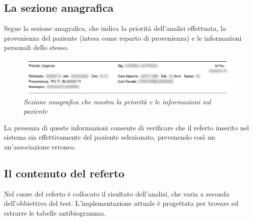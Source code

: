 \subsection{La sezione anagrafica}
Segue la sezione anagrafica, che indica la priorità dell'analisi effettuata, la provenienza del paziente (intesa come reparto di provenienza) e le informazioni personali dello stesso.
\begin{figure}[h!]
	\centering
	\includegraphics[width=.99\columnwidth]{images/sezione_anagrafica.png}
	\caption{\textit{Sezione anagrafica che mostra la priorità e le informazioni sul paziente}}
	\label{fig:header}
\end{figure}
\bigskip
\newline
La presenza di queste informazioni consente di verificare che il referto inserito nel sistema sia effettivamente del paziente selezionato, prevenendo così un un’associazione erronea.
\newpage
\subsection{Il contenuto del referto}
Nel cuore del referto è collocato il risultato dell'analisi, che varia a seconda dell'obbiettivo del test. L'implementazione attuale è progettata per trovare ed estrarre le tabelle antibiogramma. 

